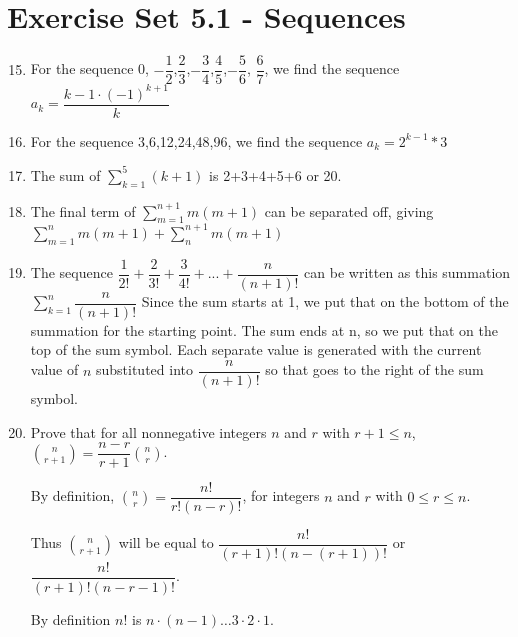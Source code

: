 \documentclass[12pt]{article}
\begin{document}
\setcounter{section}{5}
\section*{Exercise Set 5.1 - Sequences}
\begin{enumerate}
  \setcounter{enumi}{14}
\item %
For the sequence 0, $-
\dfrac{1}{2}$,$\dfrac{2}{3}$,$-\dfrac{3}{4}$,$\dfrac{4}{5}$,$-\dfrac{5}{6}$,
$\dfrac{6}{7}$, we find the sequence $a_{k} = \dfrac{k-1 \cdot (-1)^{k+1}  }{k}$
\item %
For the sequence 3,6,12,24,48,96, we find the sequence $a_{k} =
2^{k-1} * 3$
  \setcounter{enumi}{18}
\item %
The sum of $\displaystyle\sum_{k=1}^{5}(k+1)$ is 2+3+4+5+6 or 20.
  \setcounter{enumi}{38}
\item %
The final term of $\displaystyle\sum_{m=1}^{n+1}m(m+1)$ can be
separated off, giving $\displaystyle\sum_{m=1}^{n}m(m+1) + \displaystyle\sum_{n}^{n+1}m(m+1)$
  \setcounter{enumi}{49}
\item %

  The sequence $\dfrac{1}{2!} + \dfrac{2}{3!} + \dfrac{3}{4!} + ... + \dfrac{n}{(n+1)!}$ can be written as
  this summation $\displaystyle\sum_{k=1}^{n}\dfrac{n}{(n+1)!}$ Since the sum starts at 1, we put that on the
  bottom of the summation for the starting point. The sum ends at n, so we put that on the top of the sum
  symbol. Each separate value is generated with the current value of $n$ substituted into $\dfrac{n}{(n+1)!}$
  so that goes to the right of the sum symbol.

  \setcounter{enumi}{77}
\item %

  Prove that for all nonnegative integers $n$ and $r$ with $r + 1 \leq n$, $\displaystyle{n \choose r + 1} =
  \dfrac{n - r}{r+1}\displaystyle{n \choose r}$.

  By definition, $\displaystyle{n \choose r} = \dfrac{n!}{r!(n - r)!}$, for integers $n$ and $r$ with $0 \leq
  r \leq n$.

Thus $\displaystyle{n \choose r + 1}$ will be equal to $\dfrac{n!}{(r+1)!(n - (r+1))!}$ or
$\dfrac{n!}{(r+1)!(n - r -1)!}$.
  
By definition $n!$ is $n \cdot (n - 1) \ldots 3 \cdot 2 \cdot 1$.


\end{enumerate}
\end{document}
